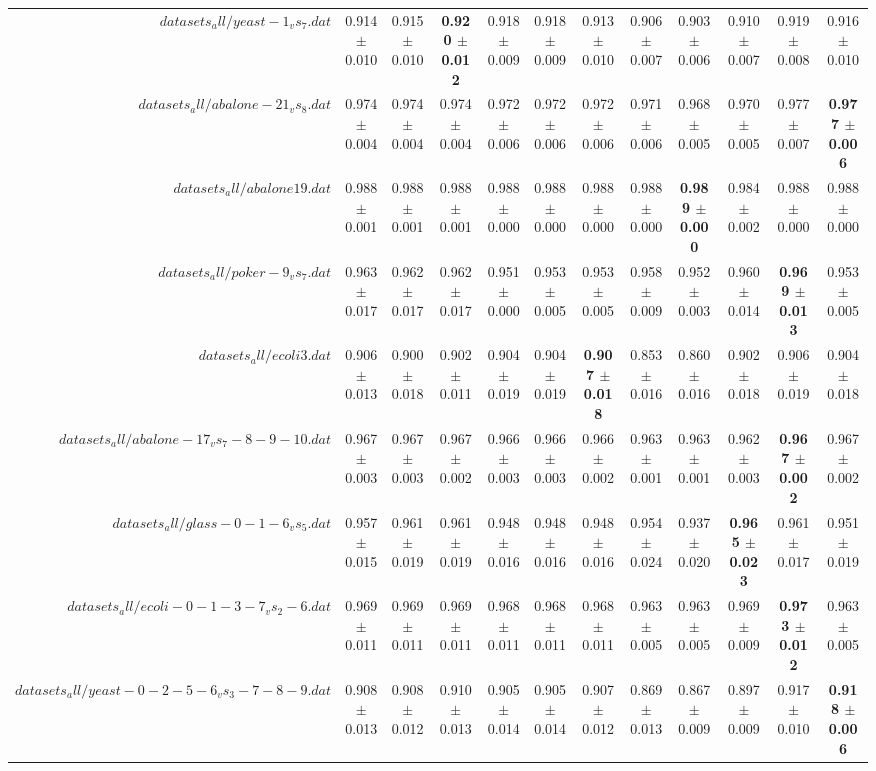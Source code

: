 \begin{table}[!ht]
{\begin{tabular}{r c c c c c c c c c c c}
$datasets_all/yeast-1_vs_7.dat$ & 0.914 $\pm$ 0.010 & 0.915 $\pm$ 0.010 & \textbf{0.920 $\pm$ 0.012} & 0.918 $\pm$ 0.009 & 0.918 $\pm$ 0.009 & 0.913 $\pm$ 0.010 & 0.906 $\pm$ 0.007 & 0.903 $\pm$ 0.006 & 0.910 $\pm$ 0.007 & 0.919 $\pm$ 0.008 & 0.916 $\pm$ 0.010 \\
$datasets_all/abalone-21_vs_8.dat$ & 0.974 $\pm$ 0.004 & 0.974 $\pm$ 0.004 & 0.974 $\pm$ 0.004 & 0.972 $\pm$ 0.006 & 0.972 $\pm$ 0.006 & 0.972 $\pm$ 0.006 & 0.971 $\pm$ 0.006 & 0.968 $\pm$ 0.005 & 0.970 $\pm$ 0.005 & 0.977 $\pm$ 0.007 & \textbf{0.977 $\pm$ 0.006} \\
$datasets_all/abalone19.dat$ & 0.988 $\pm$ 0.001 & 0.988 $\pm$ 0.001 & 0.988 $\pm$ 0.001 & 0.988 $\pm$ 0.000 & 0.988 $\pm$ 0.000 & 0.988 $\pm$ 0.000 & 0.988 $\pm$ 0.000 & \textbf{0.989 $\pm$ 0.000} & 0.984 $\pm$ 0.002 & 0.988 $\pm$ 0.000 & 0.988 $\pm$ 0.000 \\
$datasets_all/poker-9_vs_7.dat$ & 0.963 $\pm$ 0.017 & 0.962 $\pm$ 0.017 & 0.962 $\pm$ 0.017 & 0.951 $\pm$ 0.000 & 0.953 $\pm$ 0.005 & 0.953 $\pm$ 0.005 & 0.958 $\pm$ 0.009 & 0.952 $\pm$ 0.003 & 0.960 $\pm$ 0.014 & \textbf{0.969 $\pm$ 0.013} & 0.953 $\pm$ 0.005 \\
$datasets_all/ecoli3.dat$ & 0.906 $\pm$ 0.013 & 0.900 $\pm$ 0.018 & 0.902 $\pm$ 0.011 & 0.904 $\pm$ 0.019 & 0.904 $\pm$ 0.019 & \textbf{0.907 $\pm$ 0.018} & 0.853 $\pm$ 0.016 & 0.860 $\pm$ 0.016 & 0.902 $\pm$ 0.018 & 0.906 $\pm$ 0.019 & 0.904 $\pm$ 0.018 \\
$datasets_all/abalone-17_vs_7-8-9-10.dat$ & 0.967 $\pm$ 0.003 & 0.967 $\pm$ 0.003 & 0.967 $\pm$ 0.002 & 0.966 $\pm$ 0.003 & 0.966 $\pm$ 0.003 & 0.966 $\pm$ 0.002 & 0.963 $\pm$ 0.001 & 0.963 $\pm$ 0.001 & 0.962 $\pm$ 0.003 & \textbf{0.967 $\pm$ 0.002} & 0.967 $\pm$ 0.002 \\
$datasets_all/glass-0-1-6_vs_5.dat$ & 0.957 $\pm$ 0.015 & 0.961 $\pm$ 0.019 & 0.961 $\pm$ 0.019 & 0.948 $\pm$ 0.016 & 0.948 $\pm$ 0.016 & 0.948 $\pm$ 0.016 & 0.954 $\pm$ 0.024 & 0.937 $\pm$ 0.020 & \textbf{0.965 $\pm$ 0.023} & 0.961 $\pm$ 0.017 & 0.951 $\pm$ 0.019 \\
$datasets_all/ecoli-0-1-3-7_vs_2-6.dat$ & 0.969 $\pm$ 0.011 & 0.969 $\pm$ 0.011 & 0.969 $\pm$ 0.011 & 0.968 $\pm$ 0.011 & 0.968 $\pm$ 0.011 & 0.968 $\pm$ 0.011 & 0.963 $\pm$ 0.005 & 0.963 $\pm$ 0.005 & 0.969 $\pm$ 0.009 & \textbf{0.973 $\pm$ 0.012} & 0.963 $\pm$ 0.005 \\
$datasets_all/yeast-0-2-5-6_vs_3-7-8-9.dat$ & 0.908 $\pm$ 0.013 & 0.908 $\pm$ 0.012 & 0.910 $\pm$ 0.013 & 0.905 $\pm$ 0.014 & 0.905 $\pm$ 0.014 & 0.907 $\pm$ 0.012 & 0.869 $\pm$ 0.013 & 0.867 $\pm$ 0.009 & 0.897 $\pm$ 0.009 & 0.917 $\pm$ 0.010 & \textbf{0.918 $\pm$ 0.006} \\

\end{tabular}}
\end{table}

